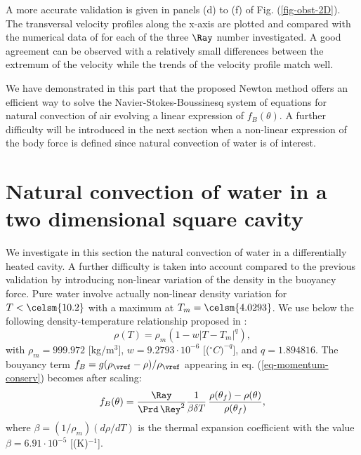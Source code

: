 A more accurate validation is given in panels (d) to (f) of Fig. (\ref{fig-obst-2D}).
The transversal velocity profiles along the x-axis are plotted and compared with the numerical data of \cite{Raluca2013} for each of the three $\Ray$ number investigated. 
A good agreement can be observed with a relatively small differences between the extremum of the velocity while the trends of the velocity profile match well.

We have demonstrated in this part that the proposed Newton method offers an efficient way to solve the Navier-Stokes-Boussinesq system of equations for natural convection of air evolving a linear expression of $f_B(\theta)$.
A further difficulty will be introduced in the next section when a non-linear expression of the body force is defined since natural convection of water is of interest.

\section{Natural convection of water in a two dimensional square cavity}\label{sec: natconv-water}
We investigate in this section the natural convection of water in a differentially heated cavity. 
A further difficulty is taken into account compared to the previous validation by introducing non-linear variation of the density in the buoyancy force.
Pure water involve actually non-linear density variation for $T< \celsm{10.2}$ with a maximum at $T_m= \celsm{4.0293}$. 
We use below the following density-temperature relationship  proposed in \cite{Gebhart1977}:
\begin{equation}
\rho(T)=\rho_m \left(1 - w \left|T - T_m\right|^q\right),
\end{equation}
with $\rho_m=999.972$ [kg/m$^3$], $w=9.2793\cdot 10^{-6}$ [($^\circ C)^{-q}$], and $q=1.894816$.
The bouyancy term $f_B = g(\rho_\vref-\rho)/\rho_\vref$ appearing in eq. (\ref{eq-momentum-conserv})  becomes after scaling:
\begin{equation}
f_B(\theta) = \frac{\Ray}{\Prd \, \Rey^2} \frac{1}{\beta \delta T}\, \frac{\rho(\theta_f)-\rho(\theta)}{\rho(\theta_f)},
\label{eq-fBnonlin}
\end{equation}
where $\beta=(1/\rho_m) \left(d\rho/dT\right)$ is the thermal expansion coefficient with the value \cite{Scanlon2004} $\beta=6.91 \cdot 10^{-5}$ [(K)$^{-1}$].

